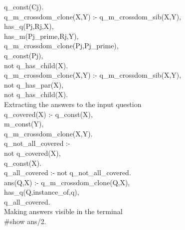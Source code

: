 q\_const(Cj).\\
q\_m\_crossdom\_clone(X,Y) :- q\_m\_crossdom\_sib(X,Y),\\
has\_q(Pj,Rj,X),\\
has\_m(Pj\_prime,Rj,Y),\\
q\_m\_crossdom\_clone(Pj,Pj\_prime),\\
q\_const(Pj),\\
not q\_has\_child(X).\\
q\_m\_crossdom\_clone(X,Y) :- q\_m\_crossdom\_sib(X,Y),\\
not q\_has\_par(X),\\
not q\_has\_child(X).\\
Extracting the answers to the input question\\
q\_covered(X) :- q\_const(X),\\
m\_const(Y),\\
q\_m\_crossdom\_clone(X,Y).\\
q\_not\_all\_covered :-\\
not q\_covered(X),\\
q\_const(X).\\
q\_all\_covered :- not q\_not\_all\_covered.\\
ans(Q,X) :- q\_m\_crossdom\_clone(Q,X),\\
has\_q(Q,instance\_of,q),\\
q\_all\_covered.\\
Making answers visible in the terminal\\
\#show ans/2.\\